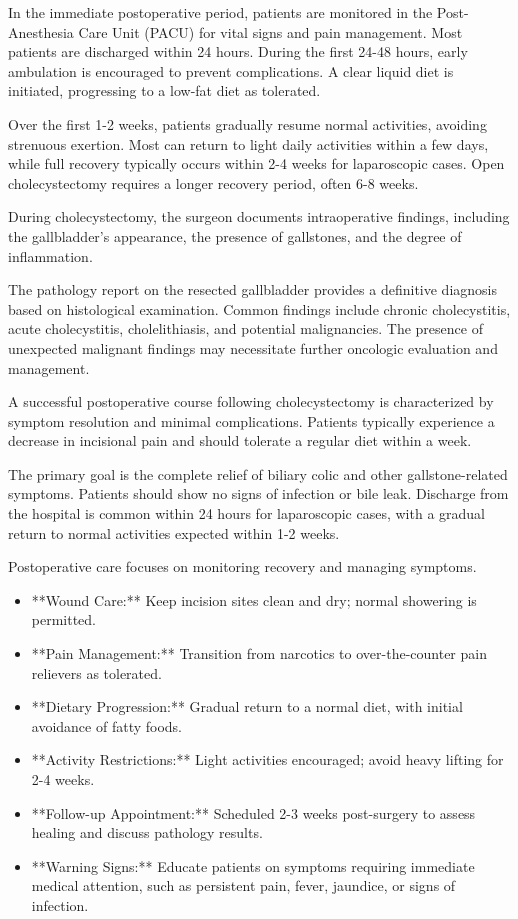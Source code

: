 In the immediate postoperative period, patients are monitored in the Post-Anesthesia Care Unit (PACU) for vital signs and pain management. Most patients are discharged within 24 hours. During the first 24-48 hours, early ambulation is encouraged to prevent complications. A clear liquid diet is initiated, progressing to a low-fat diet as tolerated. 

Over the first 1-2 weeks, patients gradually resume normal activities, avoiding strenuous exertion. Most can return to light daily activities within a few days, while full recovery typically occurs within 2-4 weeks for laparoscopic cases. Open cholecystectomy requires a longer recovery period, often 6-8 weeks.

During cholecystectomy, the surgeon documents intraoperative findings, including the gallbladder's appearance, the presence of gallstones, and the degree of inflammation. 

The pathology report on the resected gallbladder provides a definitive diagnosis based on histological examination. Common findings include chronic cholecystitis, acute cholecystitis, cholelithiasis, and potential malignancies. The presence of unexpected malignant findings may necessitate further oncologic evaluation and management.

A successful postoperative course following cholecystectomy is characterized by symptom resolution and minimal complications. Patients typically experience a decrease in incisional pain and should tolerate a regular diet within a week. 

The primary goal is the complete relief of biliary colic and other gallstone-related symptoms. Patients should show no signs of infection or bile leak. Discharge from the hospital is common within 24 hours for laparoscopic cases, with a gradual return to normal activities expected within 1-2 weeks.

Postoperative care focuses on monitoring recovery and managing symptoms. 

\begin{itemize}
  \item **Wound Care:** Keep incision sites clean and dry; normal showering is permitted.
  \item **Pain Management:** Transition from narcotics to over-the-counter pain relievers as tolerated.
  \item **Dietary Progression:** Gradual return to a normal diet, with initial avoidance of fatty foods.
  \item **Activity Restrictions:** Light activities encouraged; avoid heavy lifting for 2-4 weeks.
  \item **Follow-up Appointment:** Scheduled 2-3 weeks post-surgery to assess healing and discuss pathology results.
  \item **Warning Signs:** Educate patients on symptoms requiring immediate medical attention, such as persistent pain, fever, jaundice, or signs of infection.
\end{itemize}

